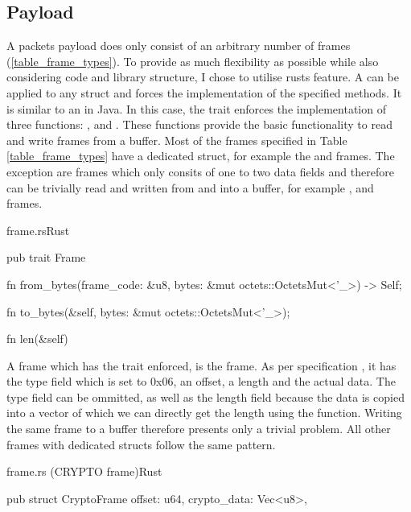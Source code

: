 \subsection{Payload}

A packets payload does only consist of an arbitrary number of frames (\ref{table_frame_types}). To provide as much flexibility as possible
while also considering code and library structure, I chose to utilise rusts  feature. A  can be
applied to any struct and forces the implementation of the specified methods. It is similar to an  in Java.
In this case, the  trait enforces
the implementation of three functions: ,  and . These functions
provide the basic functionality to read and write frames from a buffer. Most of the
frames specified in Table \ref{table_frame_types} have a dedicated struct, for example the  and  frames.
The exception are frames which only consits of one to two data fields and therefore can be trivially read and written from and into
a buffer, for example ,  and  frames.

\begin{codeblock}{frame.rs}{Rust}
    \begin{rustcode}
        pub trait Frame {
            fn from_bytes(frame_code: &u8, bytes: &mut octets::OctetsMut<'_>) -> Self;

            fn to_bytes(&self, bytes: &mut octets::OctetsMut<'_>);

            fn len(&self)
        }
    \end{rustcode}
\end{codeblock}

A frame which has the  trait enforced, is the  frame. As per specification \cite[110]{rfc9000},
it has the type field which is set to 0x06, an offset, a length and the actual data. The type field can be ommitted, as well as the
length field because the data is copied into a vector of which we can directly get the length using the  function.
Writing the same frame to a buffer therefore presents only a trivial problem. All other frames with dedicated structs follow the same
pattern.

\begin{codeblock}{frame.rs (CRYPTO frame)}{Rust}
    \begin{rustcode}
        pub struct CryptoFrame {
            offset: u64,
            crypto_data: Vec<u8>,
        }
    \end{rustcode}
\end{codeblock}

